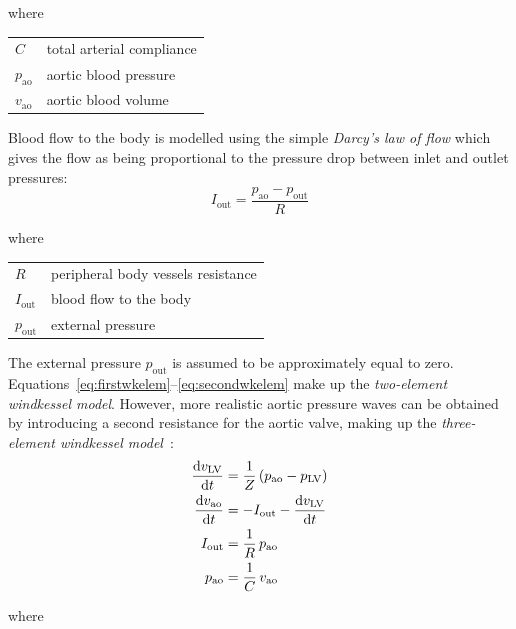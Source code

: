 \noindent
where

\vspace{0.2cm}
\begin{tabular}{ll}
    $C$ & total arterial compliance \\
    $p_{\textrm{ao}}$ & aortic blood pressure \\
    $v_{\textrm{ao}}$ & aortic blood volume \\
\end{tabular}

\vspace{0.2cm}\noindent
Blood flow to the body is modelled using the simple \textit{Darcy's law of flow} which gives the flow as being proportional to the pressure drop between inlet and outlet pressures:
%
\begin{equation}\label{eq:secondwkelem}
    I_{\textrm{out}} = \frac{p_{\textrm{ao}}-p_{\textrm{out}}}{R} 
\end{equation}

\noindent
where

\vspace{0.2cm}
\begin{tabular}{ll}
    $R$ & peripheral body vessels resistance \\
    $I_{\textrm{out}}$ & blood flow to the body \\
    $p_{\textrm{out}}$ & external pressure \\
\end{tabular}

\vspace{0.2cm}\noindent
The external pressure $p_{\textrm{out}}$ is assumed to be approximately equal to zero. Equations~\eqref{eq:firstwkelem}--\eqref{eq:secondwkelem} make up the \textit{two-element windkessel model}. However, more realistic aortic pressure waves can be obtained by introducing a second resistance for the aortic valve, making up the \textit{three-element windkessel model}~\cite{Westerhof:1971}:
%
\begin{align}\label{eq:windk}
    \dfrac{\mathrm{d}{v_{\textrm{LV}}}}{\mathrm{d}{t}} &= \frac{1}{Z}\,(p_{\textrm{ao}}-p_{\textrm{LV}}) \\ 
    \dfrac{\mathrm{d}{v_{\textrm{ao}}}}{\mathrm{d}{t}} &= -I_{\textrm{out}}-\dfrac{\mathrm{d}{v_{\textrm{LV}}}}{\mathrm{d}{t}} \\
    I_{\textrm{out}} &= \frac{1}{R}\,p_{\textrm{ao}} \\
    p_{\textrm{ao}} &= \frac{1}{C}\,v_{\textrm{ao}}
\end{align}

\noindent
where

